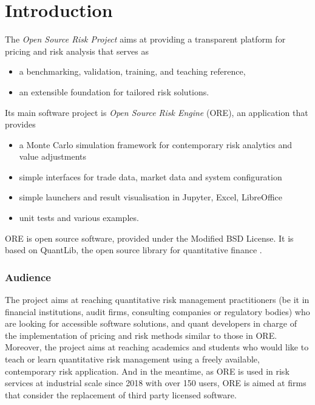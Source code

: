 \section{Introduction}

The {\em Open Source Risk Project} \cite{ORE} aims at providing a transparent platform for pricing and risk analysis
that serves as
\begin{itemize}
\item a benchmarking, validation, training, and teaching reference,
\item an extensible foundation for tailored risk solutions.
\end{itemize}

Its main software project is {\em Open Source Risk Engine} (ORE), an application that provides
\begin{itemize}
\item a Monte Carlo simulation framework for contemporary risk analytics and value adjustments
\item simple interfaces for trade data, market data and system configuration
\item simple launchers and result visualisation in Jupyter, Excel, LibreOffice
\item unit tests and various examples.  
\end{itemize}
ORE is open source software, provided under the Modified BSD License. It is based 
on QuantLib, the open source library for quantitative finance \cite{QL}.

\subsubsection*{Audience}
The project aims at reaching quantitative risk ma\-nage\-ment practitioners (be it in financial institutions, audit
firms, consulting companies or regulatory bodies) who are looking for accessible software solutions, and quant
developers in charge of the implementation of pricing and risk methods similar to those in ORE. Moreover, the project
aims at reaching academics and students who would like to teach or learn quantitative risk management using a freely
available, contemporary risk application. And in the meantime, as ORE is used in risk services at industrial scale since 2018
with over 150 users, ORE is aimed at firms that consider the replacement of third party licensed software. 


